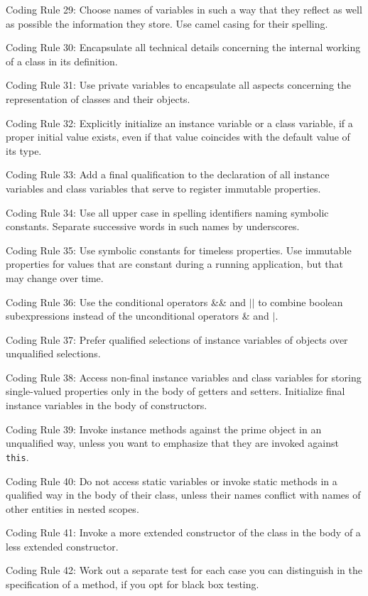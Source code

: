 \documentclass{article}
\begin{document}
\par Coding Rule 29: Choose names of variables in such a way that they reflect as well as possible the information they store. Use camel casing for their spelling.
\par Coding Rule 30: Encapsulate all technical details concerning the internal working of a class in its definition.
\par Coding Rule 31: Use private variables to encapsulate all aspects concerning the  representation of classes and their objects.
\par Coding Rule 32: Explicitly initialize an instance variable or a class variable, if a proper initial  value exists, even if that value coincides with the default value of its type.
\par Coding Rule 33: Add a final qualification to the declaration of all instance variables and  class variables that serve to register immutable properties.
\par Coding Rule 34: Use all upper case in spelling identifiers naming symbolic constants. Separate successive words in such names by underscores.
\par Coding Rule 35: Use symbolic constants for timeless properties. Use immutable  properties for values that are constant during a running application, but that may  change over time.
\par Coding Rule 36: Use the conditional operators \&\& and $\vert\vert$ to combine boolean subexpressions instead of the unconditional operators \& and $\vert$.
\par Coding Rule 37: Prefer qualified selections of instance variables of objects over unqualified selections.
\par Coding Rule 38: Access non-final instance variables and class variables for storing single-valued properties only in the body of getters and setters. Initialize final instance variables in the body of constructors.
\par Coding Rule 39: Invoke instance methods against the prime object in an unqualified way, unless you want to emphasize that they are invoked against \texttt{this}.
\par Coding Rule 40: Do not access static variables or invoke static methods in a qualified way  in the body of their class, unless their names conflict with names of other entities in nested scopes.
\par Coding Rule 41: Invoke a more extended constructor of the class in the body of a less extended constructor.
\par Coding Rule 42: Work out a separate test for each case you can distinguish in the specification of a method, if you opt for black box testing.
\end{document}
